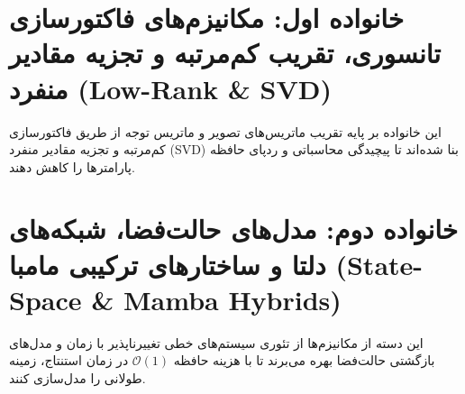
\section{خانواده اول: مکانیزم‌های فاکتورسازی تانسوری، تقریب کم‌مرتبه و تجزیه مقادیر منفرد (Low-Rank \& SVD)}
\label{sec:family_lowrank}
این خانواده بر پایه تقریب ماتریس‌های تصویر و ماتریس توجه از طریق فاکتورسازی کم‌مرتبه و تجزیه مقادیر منفرد (SVD) بنا شده‌اند تا پیچیدگی محاسباتی و ردپای حافظه پارامترها را کاهش دهند.



















\section{خانواده دوم: مدل‌های حالت‌فضا، شبکه‌های دلتا و ساختارهای ترکیبی مامبا (State-Space \& Mamba Hybrids)}
\label{sec:family_ssm}
این دسته از مکانیزم‌ها از تئوری سیستم‌های خطی تغییرناپذیر با زمان و مدل‌های بازگشتی حالت‌فضا بهره می‌برند تا با هزینه حافظه $\mathcal{O}(1)$ در زمان استنتاج، زمینه طولانی را مدل‌سازی کنند.











